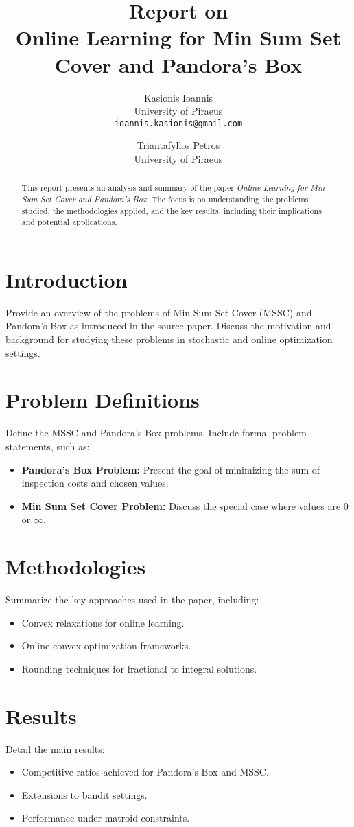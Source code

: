 \documentclass[11pt,a4paper]{article}
\title{Report on \\ \textbf{Online Learning for Min Sum Set Cover and Pandora's Box}}
\author{
    Kasionis Ioannis \\ University of Piraeus \\ \texttt{ioannis.kasionis@gmail.com}
    \and
    Triantafyllos Petros \\ University of Piraeus \\ \texttt{}
}
\date{}
\begin{document}
\maketitle

\begin{abstract}
This report presents an analysis and summary of the paper \textit{Online Learning for Min Sum Set Cover and Pandora's Box}. The focus is on understanding the problems studied, the methodologies applied, and the key results, including their implications and potential applications.
\end{abstract}

\section{Introduction}
Provide an overview of the problems of Min Sum Set Cover (MSSC) and Pandora's Box as introduced in the source paper. Discuss the motivation and background for studying these problems in stochastic and online optimization settings.

\section{Problem Definitions}
Define the MSSC and Pandora's Box problems. Include formal problem statements, such as:
\begin{itemize}
    \item \textbf{Pandora's Box Problem:} Present the goal of minimizing the sum of inspection costs and chosen values.
    \item \textbf{Min Sum Set Cover Problem:} Discuss the special case where values are 0 or $\infty$.
\end{itemize}

\section{Methodologies}
Summarize the key approaches used in the paper, including:
\begin{itemize}
    \item Convex relaxations for online learning.
    \item Online convex optimization frameworks.
    \item Rounding techniques for fractional to integral solutions.
\end{itemize}

\section{Results}
Detail the main results:
\begin{itemize}
    \item Competitive ratios achieved for Pandora's Box and MSSC.
    \item Extensions to bandit settings.
    \item Performance under matroid constraints.
\end{itemize}
\end{document}
